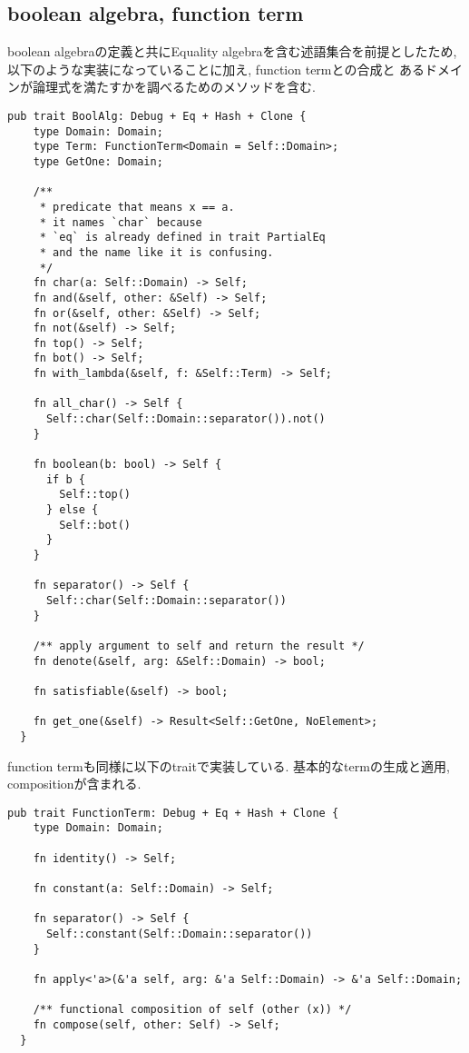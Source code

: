 \documentclass[uplatex,dvipdfmx,a4j]{jsreport}
\begin{document}
  \subsection{boolean algebra, function term}
  boolean algebraの定義と共にEquality algebraを含む述語集合を前提としたため,
  以下のような実装になっていることに加え, function termとの合成と
  あるドメインが論理式を満たすかを調べるためのメソッドを含む.
  \begin{lstlisting}[caption={boolean algebra}, label=bool_alg_impl]
  pub trait BoolAlg: Debug + Eq + Hash + Clone {
    type Domain: Domain;
    type Term: FunctionTerm<Domain = Self::Domain>;
    type GetOne: Domain;

    /**
     * predicate that means x == a.
     * it names `char` because
     * `eq` is already defined in trait PartialEq
     * and the name like it is confusing.
     */
    fn char(a: Self::Domain) -> Self;
    fn and(&self, other: &Self) -> Self;
    fn or(&self, other: &Self) -> Self;
    fn not(&self) -> Self;
    fn top() -> Self;
    fn bot() -> Self;
    fn with_lambda(&self, f: &Self::Term) -> Self;

    fn all_char() -> Self {
      Self::char(Self::Domain::separator()).not()
    }

    fn boolean(b: bool) -> Self {
      if b {
        Self::top()
      } else {
        Self::bot()
      }
    }

    fn separator() -> Self {
      Self::char(Self::Domain::separator())
    }

    /** apply argument to self and return the result */
    fn denote(&self, arg: &Self::Domain) -> bool;

    fn satisfiable(&self) -> bool;

    fn get_one(&self) -> Result<Self::GetOne, NoElement>;
  }
  \end{lstlisting}

  function termも同様に以下のtraitで実装している. 基本的なtermの生成と適用, compositionが含まれる.
  \begin{lstlisting}[caption={function term}, label=function_term_impl]
  pub trait FunctionTerm: Debug + Eq + Hash + Clone {
    type Domain: Domain;

    fn identity() -> Self;

    fn constant(a: Self::Domain) -> Self;

    fn separator() -> Self {
      Self::constant(Self::Domain::separator())
    }

    fn apply<'a>(&'a self, arg: &'a Self::Domain) -> &'a Self::Domain;

    /** functional composition of self (other (x)) */
    fn compose(self, other: Self) -> Self;
  }
  \end{lstlisting}
\end{document}

